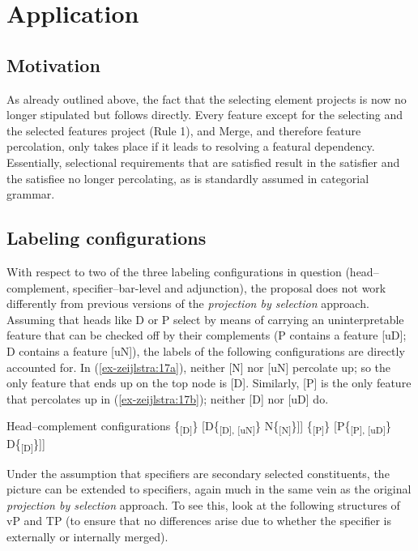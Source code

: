 \documentclass[output=paper
,modfonts
,nonflat]{langsci/langscibook}
\begin{document}
\section{Application}
\subsection{Motivation}
As already outlined above, the fact that the selecting element projects is now no longer stipulated but follows directly. Every feature except for the selecting and the selected features project (Rule 1), and Merge, and therefore feature percolation, only takes place if it leads to resolving a featural dependency. Essentially, selectional requirements that are satisfied result in the satisfier and the satisfiee no longer percolating, as is standardly assumed in categorial grammar. 

\subsection{Labeling configurations} \label{sec-zeijlstra:3.2}
With respect to two of the three labeling configurations in question (head--comp\-le\-ment, specifier--bar-level and adjunction), the proposal does not work differently from previous versions of the \textit{projection by selection} approach. Assuming that heads like D or P select by means of carrying an uninterpretable feature that can be checked off by their complements (P contains a feature [uD]; D contains a feature [uN]), the labels of the following configurations are directly accounted for. In (\ref{ex-zeijlstra:17a}), neither [N] nor [uN] percolate up; so the only feature that ends up on the top node is [D]. Similarly, [P] is the only feature that percolates up in (\ref{ex-zeijlstra:17b}); neither [D] nor [uD] do.

\begin{exe}
	\ex Head–complement configurations\label{ex-zeijlstra:17}
	\xlist
	\ex {[}\{\textsubscript{{[}D{]}}\} \label{ex-zeijlstra:17a} {[}D\{\textsubscript{{[}D{]}, {[}uN{]}}\} N\{\textsubscript{{[}N{]}}\}{]}{]}
	\ex {[}\{\textsubscript{{[}P{]}}\} \label{ex-zeijlstra:17b} {[}P\{\textsubscript{{[}P{]}, {[}uD{]}}\} D\{\textsubscript{{[}D{]}}\}{]}{]}
	\endxlist
\end{exe}
Under the assumption that specifiers are secondary selected constituents, the picture can be extended to specifiers, again much in the same vein as the original \textit{projection by selection} approach. To see this, look at the following structures of vP and TP (to ensure that no differences arise due to whether the specifier is externally or internally merged).
\end{document}
